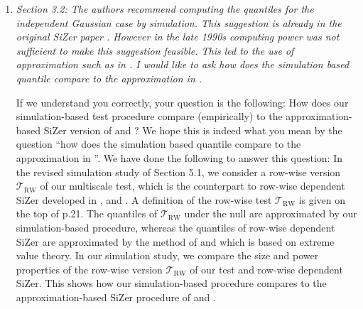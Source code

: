 \documentclass[a4paper,12pt]{article}
\begin{document}
\begin{enumerate}[label=(\arabic*),leftmargin=0.7cm]

\item \textit{Section 3.2: The authors recommend computing the quantiles for the independent Gaussian case by simulation. This suggestion is already in the original SiZer paper \citep{ChaudhuriMarron1999}. However in the late 1990s computing power was not sufficient to make this suggestion feasible. This led to the use of approximation such as in \cite{HannigMarron2006}. I would like to ask how does the simulation based quantile compare to the approximation in \cite{HannigMarron2006}.} 

If we understand you correctly, your question is the following: How does our simulation-based test procedure compare (empirically) to the approximation-based SiZer version of \cite{HannigMarron2006} and \cite{ParkHannigKang2009}? We hope this is indeed what you mean by the question ``how does the simulation based quantile compare to the approximation in \cite{HannigMarron2006}''. \newline
%
We have done the following to answer this question: In the revised simulation study of Section 5.1, we consider a row-wise version $\mathcal{T}_{\text{RW}}$ of our multiscale test, which is the counterpart to row-wise dependent SiZer developed in \cite{Rondonotti2004}, \cite{Rondonotti2007} and \cite{ParkHannigKang2009}. A definition of the row-wise test $\mathcal{T}_{\text{RW}}$ is given on the top of p.21. The quantiles of $\mathcal{T}_{\text{RW}}$ under the null are approximated by our simulation-based procedure, whereas the quantiles of row-wise dependent SiZer are approximated by the method of \cite{HannigMarron2006} and \cite{ParkHannigKang2009} which is based on extreme value theory. In our simulation study, we compare the size and power properties of the row-wise version $\mathcal{T}_{\text{RW}}$ of our test and row-wise dependent SiZer. This shows how our simulation-based procedure compares to the approximation-based SiZer procedure of \cite{HannigMarron2006} and \cite{ParkHannigKang2009}. 


\end{enumerate}
\end{document}
